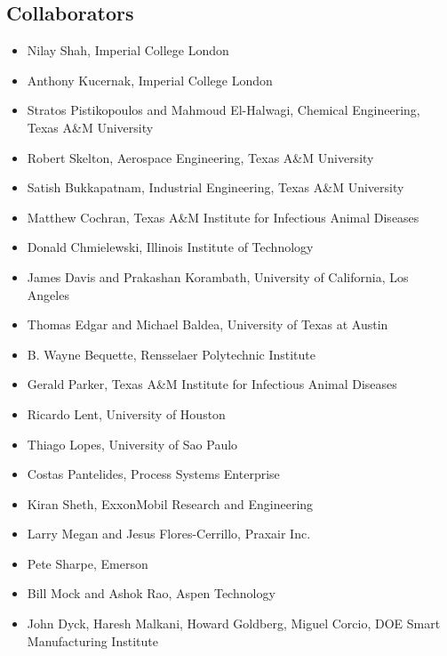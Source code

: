 \documentclass[10pt]{article}
\newenvironment{itemizeZero}{\begin{itemize}
\setlength{\itemsep}{0pt}
}
{\end{itemize}}
\begin{document}
\subsection{Collaborators}
\begin{itemizeZero}
\item Nilay Shah, Imperial College London
\item Anthony Kucernak, Imperial College London
\item Stratos Pistikopoulos and Mahmoud El-Halwagi, Chemical Engineering, Texas A\&M University 
\item Robert Skelton, Aerospace Engineering, Texas A\&M University
\item Satish Bukkapatnam, Industrial Engineering, Texas A\&M University
\item Matthew Cochran, Texas A\&M Institute for Infectious Animal Diseases
\item Donald Chmielewski, Illinois Institute of Technology
\item James Davis and Prakashan Korambath, University of California, Los Angeles
\item Thomas Edgar and Michael Baldea, University of Texas at Austin
\item B. Wayne Bequette, Rensselaer Polytechnic Institute
\item Gerald Parker, Texas A\&M Institute for Infectious Animal Diseases
\item Ricardo Lent, University of Houston
\item Thiago Lopes, University of Sao Paulo
\item Costas Pantelides, Process Systems Enterprise
\item Kiran Sheth, ExxonMobil Research and Engineering
\item Larry Megan and Jesus Flores-Cerrillo, Praxair Inc.
\item Pete Sharpe, Emerson
\item Bill Mock and Ashok Rao, Aspen Technology
\item John Dyck, Haresh Malkani, Howard Goldberg, Miguel Corcio, DOE Smart Manufacturing Institute
\end{itemizeZero}

\end{document}
